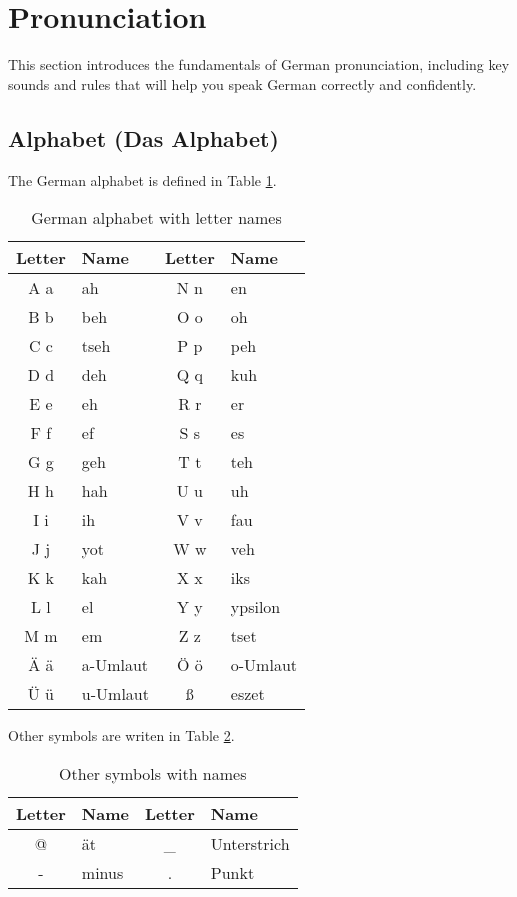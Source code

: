 \section{Pronunciation}\label{sec:pronunciation}

This section introduces the fundamentals of German pronunciation, including key sounds and rules that will help you speak German correctly and confidently.

\subsection{Alphabet (Das Alphabet)}\label{subsec:alphabet}

The German alphabet is defined in Table \ref{tab:germanAlphabet}.

\begin{table}[H]
    \centering
    \begin{tabular}{|c|l||c|l|}
    \hline
    Letter & Name & Letter & Name \\
    \hline
    A a & ah & N n & en \\
    B b & beh & O o & oh \\
    C c & tseh & P p & peh \\
    D d & deh & Q q & kuh \\
    E e & eh & R r & er \\
    F f & ef & S s & es \\
    G g & geh & T t & teh \\
    H h & hah & U u & uh \\
    I i & ih & V v & fau \\
    J j & yot & W w & veh \\
    K k & kah & X x & iks \\
    L l & el & Y y & ypsilon \\
    M m & em & Z z & tset \\
    Ä ä & a-Umlaut & Ö ö & o-Umlaut \\
    Ü ü & u-Umlaut & \ss{} & eszet \\
    \hline
    \end{tabular}
    \caption{German alphabet with letter names}
    \label{tab:germanAlphabet}
\end{table}


Other symbols are writen in Table \ref{tab:otherSymbols}.

\begin{table}[H]
    \centering
    \begin{tabular}{|c|l||c|l|}
    \hline
    Letter & Name & Letter & Name \\
    \hline
    @ & ät & \_ & Unterstrich \\
    - & minus & . & Punkt \\
    \hline
    \end{tabular}
    \caption{Other symbols with names}
    \label{tab:otherSymbols}
\end{table}

